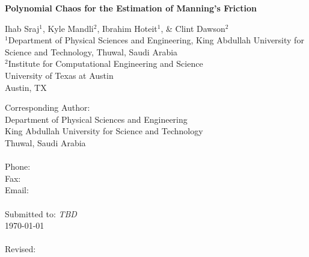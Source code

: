 \renewcommand{\thefootnote}{\fnsymbol{footnote}}

\begin{center}
\begin{Large}
{\bf Polynomial Chaos for the Estimation of Manning's Friction}\\

\end{Large}
\bigskip
\bigskip
Ihab Sraj$^1$, Kyle Mandli$^2$, Ibrahim Hoteit$^1$, \& Clint Dawson$^2$\\
\bigskip
$^1$Department of Physical Sciences and Engineering,
King Abdullah University for Science and Technology, Thuwal, Saudi Arabia \\
$^2$Institute for Computational Engineering and Science\\
University of Texas at Austin\\
Austin, TX 
\end{center}

\vspace{5.5cm}

\begin{tabbing}
Corresponding Author: \hspace{5mm} \=  \\
       \> Department of Physical Sciences and Engineering \\
       \> King Abdullah University for Science and Technology \\
       \> Thuwal, Saudi Arabia\\
       \> \\
Phone: \>  \\
Fax:   \>  \\
Email: \>    \\
\\
Submitted to: \> {\it TBD} \\
\> \today \\
\\
Revised: \>  

\end{tabbing}




